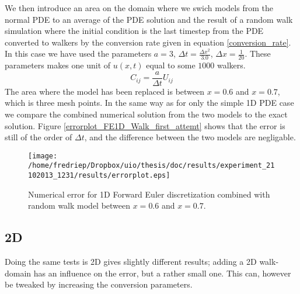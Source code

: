 We then introduce an area on the domain where we swich models from the normal PDE to an average of the PDE solution and the result of a random walk simulation where the initial condition is the last timestep from the PDE converted to walkers by the conversion rate given in equation \ref{conversion_rate}. In this case we have used the parameters $a=3$, $\Delta t = \frac{\Delta x^2}{3.0}$, $\Delta x = \frac{1}{20}$. 
These parameters makes one unit of $u(x,t)$ equal to some $1000$ walkers. 
\begin{equation}\label{conversion_rate}
 C_{ij} = \frac{a}{\Delta t}U_{ij}
\end{equation}
The area where the model has been replaced is between $x=0.6$ and $x=0.7$, which is three mesh points. 
In the same way as for only the simple 1D PDE case we compare the combined numerical solution from the two models to the exact solution. 
Figure \ref{errorplot_FE1D_Walk_first_attemt} shows that the error is still of the order of $\Delta t$, and the difference between the two models are negligable. 
\begin{figure}[H]
\centering
\texttt{[image: /home/fredriep/Dropbox/uio/thesis/doc/results/experiment\_21102013\_1231/results/errorplot.eps]}
\caption{Numerical error for 1D Forward Euler discretization combined with random walk model between $x=0.6$ and $x=0.7$.}
\end{figure}
\subsection{2D}
Doing the same tests is 2D gives slightly different results; adding a 2D walk-domain has an influence on the error, but a rather small one. 
This can, however be tweaked by increasing the conversion parameters.